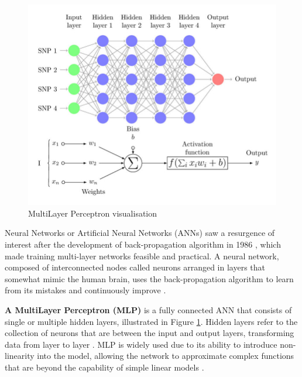 \begin{figure}[htbp]
    \centering
    \includegraphics[width=0.9\linewidth]{images/mlp.png}
    \caption{MultiLayer Perceptron visualisation \cite{perez-enciso-2019-guide}}
    \label{fig:mlp}
\end{figure}

Neural Networks or Artificial Neural Networks (ANNs) saw a resurgence of interest after the development of back-propagation algorithm in 1986 \cite{rumelhart-1986-ann}, which made training multi-layer networks feasible and practical. A neural network, composed of interconnected nodes called neurons arranged in layers that somewhat mimic the human brain, uses the back-propagation algorithm to learn from its mistakes and continuously improve \cite{aws-neural-network}.

\textbf{A MultiLayer Perceptron (MLP)} is a fully connected ANN that consists of single or multiple hidden layers, illustrated in Figure \ref{fig:mlp}. Hidden layers refer to the collection of neurons that are between the input and output layers, transforming data from layer to layer \cite{uzair-2020-hidden-layers}. MLP is widely used due to its ability to introduce non-linearity into the model, allowing the network to approximate complex functions that are beyond the capability of simple linear models \cite{popescue-2009-mlp}.

